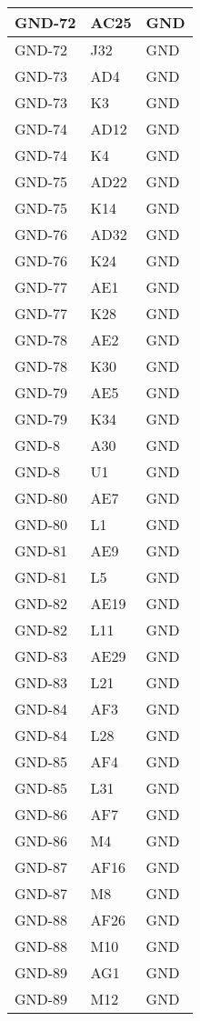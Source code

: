 \begin{footnotesize}
\begin{longtable}{|p{7cm}|p{1cm}|p{5cm}|}
GND-72	&	AC25	&	GND	\\ \hline
GND-72	&	J32	&	GND	\\ \hline
GND-73	&	AD4	&	GND	\\ \hline
GND-73	&	K3	&	GND	\\ \hline
GND-74	&	AD12	&	GND	\\ \hline
GND-74	&	K4	&	GND	\\ \hline
GND-75	&	AD22	&	GND	\\ \hline
GND-75	&	K14	&	GND	\\ \hline
GND-76	&	AD32	&	GND	\\ \hline
GND-76	&	K24	&	GND	\\ \hline
GND-77	&	AE1	&	GND	\\ \hline
GND-77	&	K28	&	GND	\\ \hline
GND-78	&	AE2	&	GND	\\ \hline
GND-78	&	K30	&	GND	\\ \hline
GND-79	&	AE5	&	GND	\\ \hline
GND-79	&	K34	&	GND	\\ \hline
GND-8	&	A30	&	GND	\\ \hline
GND-8	&	U1	&	GND	\\ \hline
GND-80	&	AE7	&	GND	\\ \hline
GND-80	&	L1	&	GND	\\ \hline
GND-81	&	AE9	&	GND	\\ \hline
GND-81	&	L5	&	GND	\\ \hline
GND-82	&	AE19	&	GND	\\ \hline
GND-82	&	L11	&	GND	\\ \hline
GND-83	&	AE29	&	GND	\\ \hline
GND-83	&	L21	&	GND	\\ \hline
GND-84	&	AF3	&	GND	\\ \hline
GND-84	&	L28	&	GND	\\ \hline
GND-85	&	AF4	&	GND	\\ \hline
GND-85	&	L31	&	GND	\\ \hline
GND-86	&	AF7	&	GND	\\ \hline
GND-86	&	M4	&	GND	\\ \hline
GND-87	&	AF16	&	GND	\\ \hline
GND-87	&	M8	&	GND	\\ \hline
GND-88	&	AF26	&	GND	\\ \hline
GND-88	&	M10	&	GND	\\ \hline
GND-89	&	AG1	&	GND	\\ \hline
GND-89	&	M12	&	GND	\\ \hline

\end{longtable}
\end{footnotesize}
